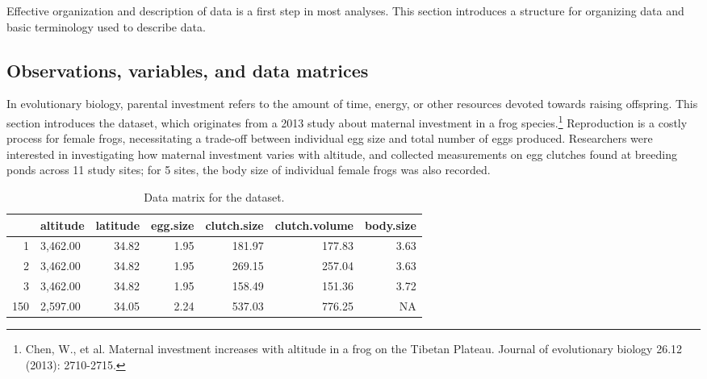 Effective organization and description of data is a first step in most analyses. This section introduces a structure for organizing data and basic terminology used to describe data.

\subsection{Observations, variables, and data matrices}
\label{frogDataExample}


In evolutionary biology, parental investment refers to the amount of time, energy, or other resources devoted towards raising offspring. This section introduces the  dataset, which originates from a 2013 study about maternal investment in a frog species.\footnote{Chen, W., et al. Maternal investment increases with altitude in a frog on the Tibetan Plateau. Journal of evolutionary biology 26.12 (2013): 2710-2715.} Reproduction is a costly process for female frogs, necessitating a trade-off between individual egg size and total number of eggs produced. Researchers were interested in investigating how maternal investment varies with altitude, and collected measurements on egg clutches found at breeding ponds across 11 study sites; for 5 sites, the body size of individual female frogs was also recorded.

\begin{table}[ht]
\centering
\begin{tabular}{rlrrrrr}
  \hline
 & altitude & latitude & egg.size & clutch.size & clutch.volume & body.size \\ 
  \hline
1 & 3,462.00 & 34.82 & 1.95 & 181.97 & 177.83 & 3.63 \\ 
  2 & 3,462.00 & 34.82 & 1.95 & 269.15 & 257.04 & 3.63 \\ 
  3 & 3,462.00 & 34.82 & 1.95 & 158.49 & 151.36 & 3.72 \\ 
  150 & 2,597.00 & 34.05 & 2.24 & 537.03 & 776.25 & NA \\ 
   \hline
\end{tabular}
\caption{Data matrix for the  dataset.} 
\label{frogDF}
\end{table}

